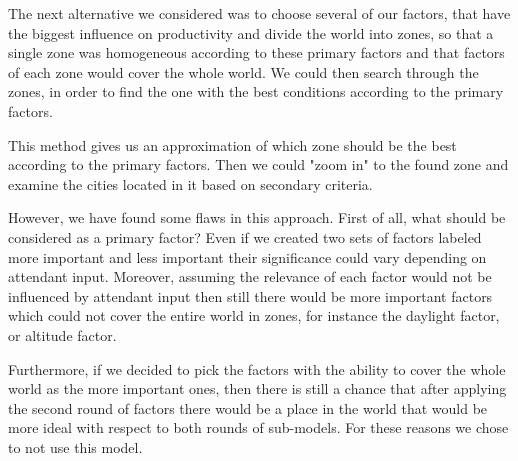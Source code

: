 
The next alternative we considered was to choose several of our factors, that have the biggest influence on productivity and divide the world into zones, so that a single zone was homogeneous according to these primary factors and that factors of each zone would cover the whole world. We could then search through the zones, in order to find the one with the best conditions according to the primary factors. 

This method gives us an approximation of which zone should be the best according to the primary factors. Then we could "zoom in" to the found zone and examine the cities located in it based on secondary criteria. 

However, we have found some flaws in this approach. First of all, what should be considered as a primary factor? Even if we created two sets of factors labeled more important and less important their significance could vary depending on attendant input. Moreover, assuming the relevance of each factor would not be influenced by attendant input then still there would be more important factors which could not cover the entire world in zones, for instance the daylight factor, or altitude factor. 

Furthermore, if we decided to pick the factors with the ability to cover the whole world as the more important ones, then there is still a chance that after applying the second round of factors there would be a place in the world that would be more ideal with respect to both rounds of sub-models. For these reasons we chose to not use this model.
